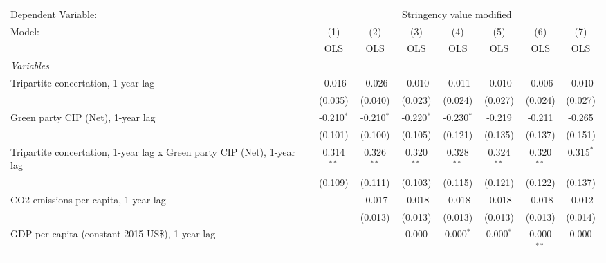 
\begingroup
\centering
\begin{tabular}{lccccccc}
   \toprule
   Dependent Variable: & \multicolumn{7}{c}{Stringency value modified}\\
   Model:                                                                  & (1)          & (2)          & (3)          & (4)          & (5)          & (6)          & (7)\\  
                                                                           &  OLS         & OLS          & OLS          & OLS          & OLS          & OLS          & OLS\\  
   \midrule
   \emph{Variables}\\
   Tripartite concertation, 1-year lag                                     & -0.016       & -0.026       & -0.010       & -0.011       & -0.010       & -0.006       & -0.010\\   
                                                                           & (0.035)      & (0.040)      & (0.023)      & (0.024)      & (0.027)      & (0.024)      & (0.027)\\   
   Green party CIP (Net), 1-year lag                                       & -0.210$^{*}$ & -0.210$^{*}$ & -0.220$^{*}$ & -0.230$^{*}$ & -0.219       & -0.211       & -0.265\\   
                                                                           & (0.101)      & (0.100)      & (0.105)      & (0.121)      & (0.135)      & (0.137)      & (0.151)\\   
   Tripartite concertation, 1-year lag x Green party CIP (Net), 1-year lag & 0.314$^{**}$ & 0.326$^{**}$ & 0.320$^{**}$ & 0.328$^{**}$ & 0.324$^{**}$ & 0.320$^{**}$ & 0.315$^{*}$\\   
                                                                           & (0.109)      & (0.111)      & (0.103)      & (0.115)      & (0.121)      & (0.122)      & (0.137)\\   
   CO2 emissions per capita, 1-year lag                                    &              & -0.017       & -0.018       & -0.018       & -0.018       & -0.018       & -0.012\\   
                                                                           &              & (0.013)      & (0.013)      & (0.013)      & (0.013)      & (0.013)      & (0.014)\\   
   GDP per capita (constant 2015 US\$), 1-year lag                         &              &              & 0.000        & 0.000$^{*}$  & 0.000$^{*}$  & 0.000$^{**}$ & 0.000\\   

\end{tabular}
